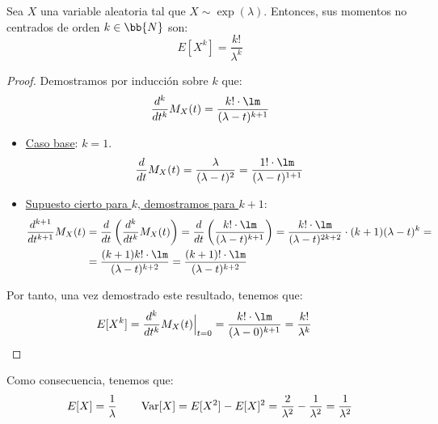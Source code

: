 \begin{prop}
    Sea $X$ una variable aleatoria tal que $X\sim \exp(\lambda)$. Entonces, sus momentos no centrados de orden $k\in \bb{N}$ son:
    \begin{equation*}
        E[X^k] = \dfrac{k!}{\lambda^k}
    \end{equation*}
\end{prop}
\begin{proof}
    Demostramos por inducción sobre $k$ que:
    \begin{equation*}
        \dfrac{d^k}{dt^k} M_X(t) = \dfrac{k!\cdot \lm}{(\lambda-t)^{k+1}}
    \end{equation*}
    \begin{itemize}
        \item \ul{Caso base}: $k=1$.
        \begin{equation*}
            \dfrac{d}{dt} M_X(t) = \dfrac{\lambda}{(\lambda-t)^2} = \dfrac{1! \cdot \lm}{(\lambda-t)^{1+1}}
        \end{equation*}

        \item \ul{Supuesto cierto para $k$, demostramos para $k+1$}:
        \begin{align*}
            \dfrac{d^{k+1}}{dt^{k+1}} M_X(t) &= \dfrac{d}{dt} \left( \dfrac{d^k}{dt^k} M_X(t) \right)
            = \dfrac{d}{dt} \left( \dfrac{k!\cdot \lm}{(\lambda-t)^{k+1}} \right)
            = \dfrac{k!\cdot \lm}{(\lambda-t)^{2k+2}}\cdot (k+1)(\lambda-t)^k
            =\\&= \dfrac{(k+1)k! \cdot \lm}{(\lambda-t)^{k+2}}
            = \dfrac{(k+1)! \cdot \lm}{(\lambda-t)^{k+2}}
        \end{align*}        
    \end{itemize}

    Por tanto, una vez demostrado este resultado, tenemos que:
    \begin{align*}
        E[X^k] &= \dfrac{d^k}{dt^k} M_X(t) \Big|_{t=0}
        = \dfrac{k! \cdot \lm}{(\lambda-0)^{k+1}}
        = \dfrac{k!}{\lambda^k}
    \end{align*}
\end{proof}

Como consecuencia, tenemos que:
\begin{equation*}
    E[X] = \dfrac{1}{\lambda} \qquad \operatorname{Var}[X] = E[X^2] - E[X]^2 = \dfrac{2}{\lambda^2} - \dfrac{1}{\lambda^2} = \dfrac{1}{\lambda^2}
\end{equation*}


